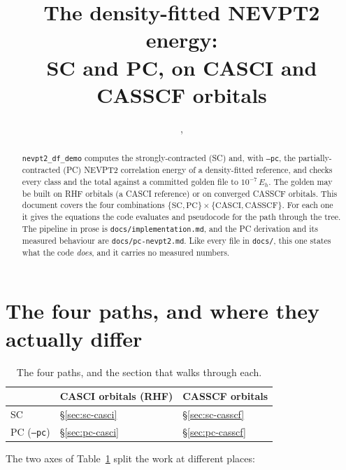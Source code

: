 \documentclass[11pt]{article}
\title{The density-fitted NEVPT2 energy:\\
SC and PC, on CASCI and CASSCF orbitals}
\author{\code{nevpt2-gpu-demo}, \code{docs/energy.tex}}
\date{}
\newcommand{\code}[1]{\texttt{#1}}
\begin{document}
\sloppy
\maketitle

\begin{abstract}
\code{nevpt2\_df\_demo} computes the strongly-contracted (SC) and, with
\code{--pc}, the partially-contracted (PC) NEVPT2 correlation energy of a
density-fitted reference, and checks every class and the total against a
committed golden file to $10^{-7}\,E_h$. The golden may be built on RHF
orbitals (a CASCI reference) or on converged CASSCF orbitals. This document
covers the four combinations
$\{\text{SC},\text{PC}\}\times\{\text{CASCI},\text{CASSCF}\}$. For each one it
gives the equations the code evaluates and pseudocode for the path through
the tree. The pipeline in prose is \code{docs/implementation.md}, and the PC
derivation and its measured behaviour are \code{docs/pc-nevpt2.md}. Like
every file in \code{docs/}, this one states what the code \emph{does}, and it
carries no measured numbers.
\end{abstract}

\tableofcontents

\section{The four paths, and where they actually differ}
\label{sec:paths}

\begin{table}[htbp]
\centering
\begin{tabular}{@{}lll@{}}
\toprule
 & CASCI orbitals (RHF) & CASSCF orbitals \\
\midrule
SC & \S\ref{sec:sc-casci} & \S\ref{sec:sc-casscf} \\
PC (\code{--pc}) & \S\ref{sec:pc-casci} & \S\ref{sec:pc-casscf} \\
\bottomrule
\end{tabular}
\caption{The four paths, and the section that walks through each.}
\label{tab:paths}
\end{table}

The two axes of Table~\ref{tab:paths} split the work at different places:
\end{document}
